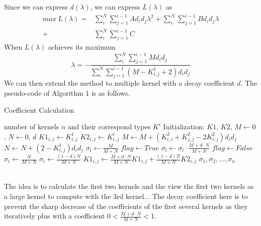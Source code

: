 \documentclass[twocolumn, a4paper]{article}
\begin{document}
Since we can express $d(\lambda)$, we can express $L(\lambda)$ as
\begin{equation}
{
\begin{aligned}
\nonumber
  max\ L(\lambda)=&\sum_{i}^N\sum_{j=1}^{i-1}Ad_id_j\lambda^2+\sum_{i}^N\sum_{j=1}^{i-1}Bd_id_j\lambda\\+ &\sum_{i}^N\sum_{j=1}^{i-1}C
  \end{aligned}
}
\end{equation}
When $L(\lambda)$ achieves its maximum
\begin{equation}
\nonumber
  \lambda=-\frac{\sum_{i}^N\sum_{j=1}^{i-1}Md_id_j}{\sum_{i}^N\sum_{j=1}^{i-1}(M-K^1_{i,j}+2)d_id_j}
\end{equation}
We can then extend the method to multiple kernel with a decay coefficient $d$. The pseudo-code of Algorithm 1 is as follows.
\begin{algorithm}
	\renewcommand{\algorithmicrequire}{\textbf{Input:}}
	\renewcommand{\algorithmicensure}{\textbf{Output:}}
	\caption{Coefficient Calculation}
	\label{alg1}
	\begin{algorithmic}[1]
		\REQUIRE number of kernels $n$ and their correspond types $K^i$
            \STATE Initialization: $K1$, $K2$, $M\leftarrow 0$, $N\leftarrow 0$, $d$
            \STATE $K1_{i,j}\leftarrow K^1_{i,j}$
            \STATE $K2_{i,j}\leftarrow K^i_{i,j}$
            \STATE $M\leftarrow M+(K^2_{i,i}+K^2_{j,j}-2K^2_{i,j})d_id_j$
            \STATE $N\leftarrow N+(2-K^1_{i,j})d_id_j$
            \ENDFOR
            \ENDFOR
            \STATE $\sigma_l \leftarrow \frac{M}{M+N}$
            \STATE $flag\leftarrow True$
            \ELSE 
            \STATE $\sigma_l\leftarrow \sigma_l\cdot\frac{M+d\cdot N}{M+N}$
            \STATE $flag\leftarrow False$
            \ENDIF
            \ENDFOR
            \STATE $\sigma_i\leftarrow \frac{N}{M+N}$
            \ELSE
            \STATE $\sigma_i\leftarrow \frac{(1-d)N}{M+N}$
            \ENDIF
            \STATE $K1_{i,j}\leftarrow \frac{M+d\cdot N}{M+N}K1_{i,j}+\frac{(1-d)N}{M+N}K2_{i,j}$
            \ENDFOR
		\ENSURE $\sigma_1, \sigma_2,...,\sigma_n$
	\end{algorithmic}  
\end{algorithm}
\\The idea is to calculate the first two kernels and the view the first two kernels as a large kernel to compute with the 3rd kernel... The decay coefficient here is to prevent the sharp decrease of the coefficients of the first several kernels as they iteratively plus with a coefficient $0<\frac{M+d\cdot N}{M+N}<1$.
\end{document}
